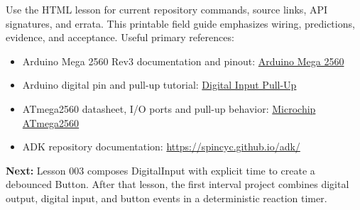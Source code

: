 \documentclass[11pt]{article}
\begin{document}
Use the HTML lesson for current repository commands, source links, API signatures,
and errata. This printable field guide emphasizes wiring, predictions, evidence,
and acceptance. Useful primary references:

\begin{itemize}
    \item Arduino Mega 2560 Rev3 documentation and pinout:
          \href{https://docs.arduino.cc/hardware/mega-2560}{Arduino Mega 2560}
    \item Arduino digital pin and pull-up tutorial:
          \href{https://docs.arduino.cc/tutorials/generic/digital-input-pullup}
          {Digital Input Pull-Up}
    \item ATmega2560 datasheet, I/O ports and pull-up behavior:
          \href{https://www.microchip.com/en-us/product/ATmega2560}{Microchip ATmega2560}
    \item ADK repository documentation:
          \url{https://spincyc.github.io/adk/}
\end{itemize}

\textbf{Next:} Lesson 003 composes DigitalInput with explicit time to create a
debounced Button. After that lesson, the first interval project combines digital
output, digital input, and button events in a deterministic reaction timer.
\end{document}
